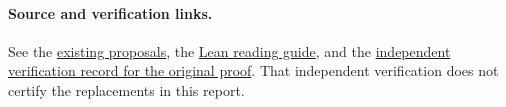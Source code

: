\documentclass[11pt]{article}
\begin{document}
\paragraph{Source and verification links.} See the \href{https://github.com/VladimirReshetnikov/ProveIt/tree/main/Analysis/GeneralizedRiemannHypothesis/docs/proposals}{existing proposals}, the \href{https://github.com/VladimirReshetnikov/ProveIt/blob/main/Analysis/GeneralizedRiemannHypothesis/Lean/grh/GUIDE.md}{Lean reading guide}, and the \href{https://math.mit.edu/~drew/shortgrh/}{independent verification record for the original proof}. That independent verification does not certify the replacements in this report.
\end{document}
